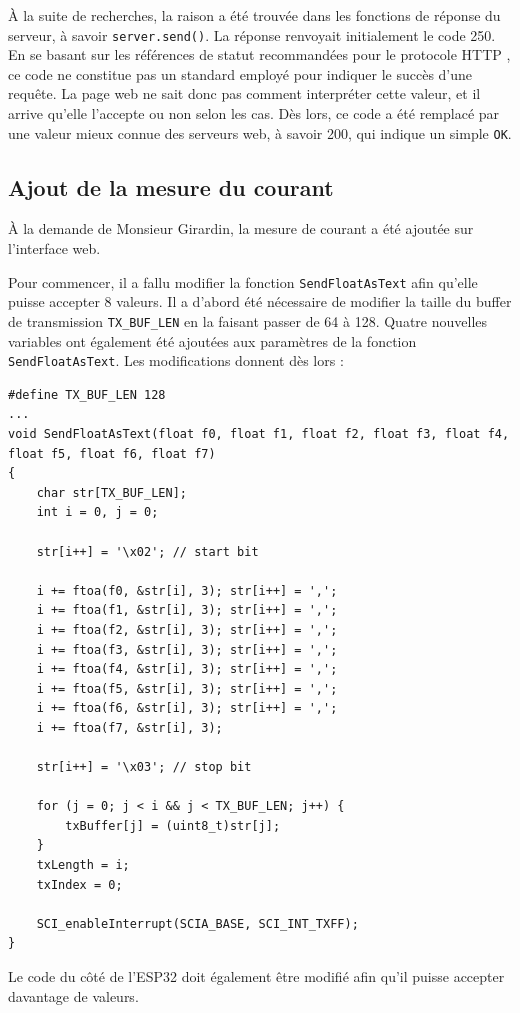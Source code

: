 À la suite de recherches, la raison a été trouvée dans les fonctions de réponse du serveur, à savoir \texttt{server.send()}. La réponse renvoyait initialement le code 250. En se basant sur les références de statut recommandées pour le protocole HTTP \cite{HTTPStatut}, ce code ne constitue pas un standard employé pour indiquer le succès d'une requête. La page web ne sait donc pas comment interpréter cette valeur, et il arrive qu'elle l'accepte ou non selon les cas. Dès lors, ce code a été remplacé par une valeur mieux connue des serveurs web, à savoir 200, qui indique un simple \texttt{OK}.

\subsection{Ajout de la mesure du courant}
À la demande de Monsieur Girardin, la mesure de courant a été ajoutée sur l'interface web.

Pour commencer, il a fallu modifier la fonction \texttt{SendFloatAsText} afin qu'elle puisse accepter 8 valeurs. Il a d'abord été nécessaire de modifier la taille du buffer de transmission \texttt{TX\_BUF\_LEN} en la faisant passer de 64 à 128. Quatre nouvelles variables ont également été ajoutées aux paramètres de la fonction \texttt{SendFloatAsText}. Les modifications donnent dès lors :

\begin{verbatim}
#define TX_BUF_LEN 128
...
void SendFloatAsText(float f0, float f1, float f2, float f3, float f4, float f5, float f6, float f7)
{
    char str[TX_BUF_LEN];
    int i = 0, j = 0;

    str[i++] = '\x02'; // start bit

    i += ftoa(f0, &str[i], 3); str[i++] = ',';
    i += ftoa(f1, &str[i], 3); str[i++] = ',';
    i += ftoa(f2, &str[i], 3); str[i++] = ',';
    i += ftoa(f3, &str[i], 3); str[i++] = ',';
    i += ftoa(f4, &str[i], 3); str[i++] = ',';
    i += ftoa(f5, &str[i], 3); str[i++] = ',';
    i += ftoa(f6, &str[i], 3); str[i++] = ',';
    i += ftoa(f7, &str[i], 3);

    str[i++] = '\x03'; // stop bit

    for (j = 0; j < i && j < TX_BUF_LEN; j++) {
        txBuffer[j] = (uint8_t)str[j];
    }
    txLength = i;
    txIndex = 0;

    SCI_enableInterrupt(SCIA_BASE, SCI_INT_TXFF);
}
\end{verbatim}

Le code du côté de l'ESP32 doit également être modifié afin qu'il puisse accepter davantage de valeurs.

